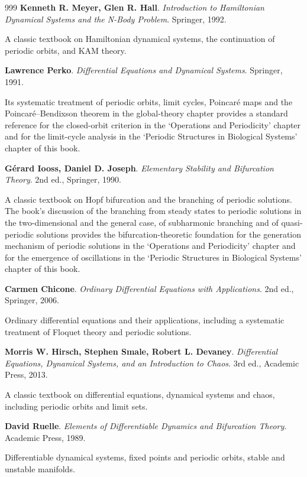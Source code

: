 \begin{thebibliography}{999}
 \textbf{Kenneth R. Meyer, Glen R. Hall}. \textit{Introduction to Hamiltonian Dynamical Systems and the N-Body Problem}. Springer, 1992.

A classic textbook on Hamiltonian dynamical systems, the continuation of periodic orbits, and KAM theory.

 \textbf{Lawrence Perko}. \textit{Differential Equations and Dynamical Systems}. Springer, 1991.

Its systematic treatment of periodic orbits, limit cycles, Poincar\'e maps and the Poincar\'e--Bendixson theorem in the global-theory chapter provides a standard reference for the closed-orbit criterion in the `Operations and Periodicity' chapter and for the limit-cycle analysis in the `Periodic Structures in Biological Systems' chapter of this book.

 \textbf{G\'erard Iooss, Daniel D. Joseph}. \textit{Elementary Stability and Bifurcation Theory}. 2nd ed., Springer, 1990.

A classic textbook on Hopf bifurcation and the branching of periodic solutions. The book's discussion of the branching from steady states to periodic solutions in the two-dimensional and the general case, of subharmonic branching and of quasi-periodic solutions provides the bifurcation-theoretic foundation for the generation mechanism of periodic solutions in the `Operations and Periodicity' chapter and for the emergence of oscillations in the `Periodic Structures in Biological Systems' chapter of this book.

 \textbf{Carmen Chicone}. \textit{Ordinary Differential Equations with Applications}. 2nd ed., Springer, 2006.

Ordinary differential equations and their applications, including a systematic treatment of Floquet theory and periodic solutions.

 \textbf{Morris W. Hirsch, Stephen Smale, Robert L. Devaney}. \textit{Differential Equations, Dynamical Systems, and an Introduction to Chaos}. 3rd ed., Academic Press, 2013.

A classic textbook on differential equations, dynamical systems and chaos, including periodic orbits and limit sets.

 \textbf{David Ruelle}. \textit{Elements of Differentiable Dynamics and Bifurcation Theory}. Academic Press, 1989.

Differentiable dynamical systems, fixed points and periodic orbits, stable and unstable manifolds.


\end{thebibliography}
